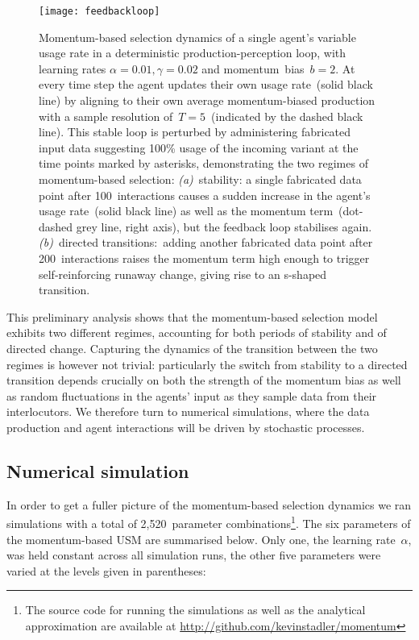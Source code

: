 \begin{figure}
\centering
\texttt{[image: feedbackloop]}
\caption[Momentum-based selection dynamics of a single agent's usage rate in a deterministic production-perception loop]{Momentum-based selection dynamics of a single agent's variable usage rate in a deterministic production-perception loop, with learning rates $\alpha=0.01, \gamma=0.02$ and momentum~bias~$b=2$. At every time step the agent updates their own usage rate~(solid black line) by aligning to their own average momentum-biased production with a sample resolution of~$T=5$~(indicated by the dashed black line). This stable loop is perturbed by administering fabricated input data suggesting 100\% usage of the incoming variant at the time points marked by asterisks, demonstrating the two regimes of momentum-based selection: \textit{(a)}~stability: a single fabricated data point after 100~interactions causes a sudden increase in the agent's usage rate~(solid black line) as well as the momentum term~(dot-dashed grey line, right axis), but the feedback loop stabilises again. \textit{(b)}~directed transitions:~adding another fabricated data point after 200~interactions raises the momentum term high enough to trigger self-reinforcing runaway change, giving rise to an s-shaped transition.}
\label{fig:feedbackloop}
\end{figure}

This preliminary analysis shows that the momentum-based selection model exhibits two different regimes, accounting for both periods of stability and of directed change. Capturing the dynamics of the transition between the two regimes is however not trivial: particularly the switch from stability to a directed transition depends crucially on both the strength of the momentum bias as well as random fluctuations in the agents' input as they sample data from their interlocutors. We therefore turn to numerical simulations, where the data production and agent interactions will be driven by stochastic processes.

\subsection{Numerical simulation}

In order to get a fuller picture of the momentum-based selection dynamics we ran simulations with a total of 2,520~parameter combinations\footnote{The source code for running the simulations as well as the analytical approximation are available at \url{http://github.com/kevinstadler/momentum}}. The six parameters of the momentum-based USM are summarised below. Only one, the learning rate~$\alpha$, was held constant across all simulation runs, the other five parameters were varied at the levels given in parentheses:

